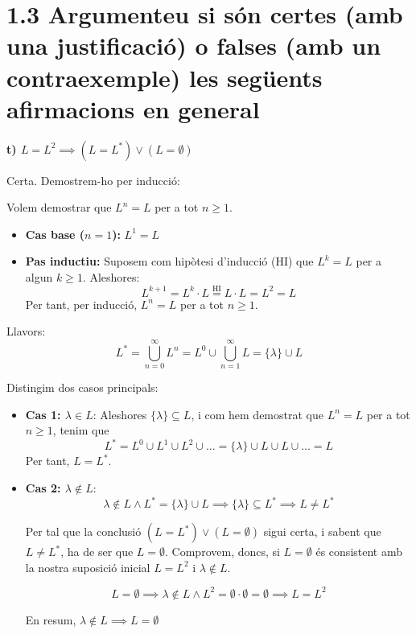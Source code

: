 \documentclass{article}
\begin{document}
\section*{\small 1.3 Argumenteu si són certes (amb una justificació) o falses (amb un contraexemple) les següents afirmacions en general}

\textbf{t) $L = L^2 \implies (L = L^*) \vee (L = \emptyset)$}

Certa. Demostrem-ho per inducció:

Volem demostrar que $L^n = L$ per a tot $n \geq 1$.

\begin{itemize}
    \item \textbf{Cas base ($n = 1$):} $L^1 = L$
    \item \textbf{Pas inductiu:} Suposem com hipòtesi d'inducció (HI) que $L^k = L$ per a algun $k \geq 1$. Aleshores:
    \[
    L^{k+1} = L^k \cdot L \overset{\text{HI}}{=} L \cdot L = L^2 = L
    \]
    Per tant, per inducció, $L^n = L$ per a tot $n \geq 1$.
\end{itemize}

Llavors:
\[
L^* = \bigcup_{n=0}^{\infty} L^n = L^0 \cup \bigcup_{n=1}^{\infty} L = \{\lambda\} \cup L
\]

Distingim dos casos principals:

\begin{itemize}
    \item \textbf{Cas 1:  $\lambda \in L$}:  
    Aleshores $\{\lambda\} \subseteq L$, i com hem demostrat que $L^n = L$ per a tot $n \geq 1$, tenim que
    \[
    L^* = L^0 \cup L^1 \cup L^2 \cup \dots = \{\lambda\} \cup L \cup L \cup \dots = L
    \]
    Per tant, $ L = L^* $.

    \item \textbf{Cas 2: $\lambda \notin L$}:
\[
\lambda \notin  L \wedge L^* = \{\lambda\} \cup L   \implies \{\lambda\} \subseteq L^* \implies L \neq L^* 
\]

Per tal que la conclusió $(L = L^*) \vee (L = \emptyset)$ sigui certa, i sabent que $L \neq L^* $, ha de ser que $L = \emptyset$. Comprovem, doncs,  si $L = \emptyset$ és consistent amb la nostra suposició inicial $L = L^2$ i $\lambda \notin L$.

\[
 L = \emptyset \implies \lambda \notin L \wedge L^2 = \emptyset \cdot \emptyset = \emptyset  \implies L = L^2
 \]

En resum,  $\lambda \notin L \implies L = \emptyset$ 
\end {itemize}
\end{document}
